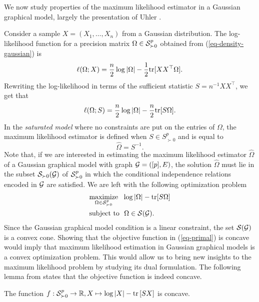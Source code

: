 We now study properties of the maximum likelihood estimator in a Gaussian graphical model, largely the presentation of Uhler \cite[Section 9]{maathuis2018handbook}.

Consider a sample $X = (X_1, \ldots, X_n)$ from a Gaussian distribution. The log-likelihood function for a precision matrix $\Omega \in \S^p_{\succ 0}$ obtained from (\ref{eq-density-gaussian}) is
\begin{equation*}
    \ell(\Omega; X) = \frac{n}{2} \log |\Omega| - \frac{1}{2}\tr[XX^\top\Omega].
\end{equation*}
Rewriting the log-likelihood in terms of the sufficient statistic $S = n^{-1}XX^\top$, we get that
\begin{equation} \label{eq-likelihood}
    \ell(\Omega; S) = \frac{n}{2}\log |\Omega| - \frac{n}{2}\tr[S\Omega].
\end{equation}
In the \textit{saturated model} where no constraints are put on the entries of $\Omega$, the maximum likelihood estimator is defined when $S \in S^p_{\succ 0}$ and is equal to
\begin{equation*}
    \hat\Omega = S^{-1}.
\end{equation*}
Note that, if we are interested in estimating the maximum likelihood estimator $\hat\Omega$ of a Gaussian graphical model with graph $\G = ([p], E)$, the solution $\hat\Omega$ must lie in the subset $\S_{\succ 0}(\G)$ of $\S^p_{\succ 0}$ in which the conditional independence relations encoded in $\G$ are satisfied. We are left with the following optimization problem
\begin{align} \label{eq-primal}
    \begin{split}
        &\underset{\Omega \in \S^p_{\succ 0}}{\t{maximize}}\ \  \log |\Omega| - \tr[S\Omega]\\
        &\t{subject to}\ \ \Omega \in \S(\G).
    \end{split}
\end{align}
Since the Gaussian graphical model condition is a linear constraint, the set $\S(\G)$ is a convex cone. Showing that the objective function in (\ref{eq-primal}) is concave would imply that maximum likelihood estimation in Gaussian graphical models is a convex optimization problem. This would allow us to bring new insights to the maximum likelihood problem by studying its dual formulation. The following lemma from \cite[Proposition 9.2.1]{maathuis2018handbook} states that the objective function is indeed concave.
\begin{lemma}
    The function $f : \S^p_{\succ 0} \rightarrow \R, X \mapsto \log |X| - \trB{SX}$ is concave.
\end{lemma}
